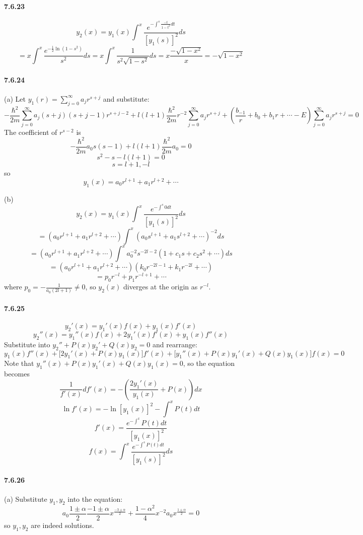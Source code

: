 \documentclass[a4paper]{article}
\begin{document}
\paragraph{7.6.23}
\[
y_2(x)=y_1(x)\int^x\frac{e^{-\int^s\frac{-t}{1-t^2}dt}}{[y_1(s)]^2}ds
\]
\[
=x\int^x\frac{e^{-\frac{1}{2}\ln(1-s^2)}}{s^2}ds=x\int^x\frac{1}{s^2\sqrt{1-s^2}}ds=x\frac{-\sqrt{1-x^2}}{x}=-\sqrt{1-x^2}
\]

\paragraph{7.6.24}
(a)
Let $y_1(r)=\sum_{j=0}^\infty a_jr^{s+j}$ and substitute:
\[
-\frac{\hbar^2}{2m}\sum_{j=0}^\infty a_j(s+j)(s+j-1)r^{s+j-2}+l(l+1)\frac{\hbar^2}{2m}r^{-2}\sum_{j=0}^\infty a_jr^{s+j}+(\frac{b_{-1}}{r}+b_0+b_1r+\cdots-E)\sum_{j=0}^\infty a_jr^{s+j}=0
\]
The coefficient of $r^{s-2}$ is
\[
-\frac{\hbar^2}{2m}a_0s(s-1)+l(l+1)\frac{\hbar^2}{2m}a_0=0
\]
\[
s^2-s-l(l+1)=0
\]
\[
s=l+1,-l
\]
so 
\[
y_1(x)=a_0r^{l+1}+a_1r^{l+2}+\cdots
\]

(b)
\[
y_2(x)=y_1(x)\int^x\frac{e^{-\int^s0dt}}{[y_1(s)]^2}ds
\]
\[
=(a_0r^{l+1}+a_1r^{l+2}+\cdots)\int^x(a_0s^{l+1}+a_1s^{l+2}+\cdots)^{-2}ds
\]
\[
=(a_0r^{l+1}+a_1r^{l+2}+\cdots)\int^xa_0^{-2}s^{-2l-2}(1+c_1s+c_2s^{2}+\cdots)ds
\]
\[
=(a_0r^{l+1}+a_1r^{l+2}+\cdots)(k_0r^{-2l-1}+k_1r^{-2l}+\cdots)
\]
\[
=p_0r^{-l}+p_1r^{-l+1}+\cdots
\]
where $p_0=-\frac{1}{a_0(2l+1)}\neq0$, so $y_2(x)$ diverges at the origin as $r^{-l}$.

\paragraph{7.6.25}
\[
y_2'(x)=y_1'(x)f(x)+y_1(x)f'(x)
\]
\[
y_2''(x)=y_1''(x)f(x)+2y_1'(x)f'(x)+y_1(x)f''(x)
\]
Substitute into $y_2''+P(x)y_2'+Q(x)y_2=0$ and rearrange:
\[
y_1(x)f''(x)+\big[2y_1'(x)+P(x)y_1(x)\big]f'(x)+\big[y_1''(x)+P(x)y_1'(x)+Q(x)y_1(x)\big]f(x)=0
\]
Note that $y_1''(x)+P(x)y_1'(x)+Q(x)y_1(x)=0$, so the equation becomes
\[
\frac{1}{f'(x)}df'(x)=-\left(\frac{2y_1'(x)}{y_1(x)}+P(x) \right)dx
\]
\[
\ln f'(x)=-\ln[y_1(x)]^2-\int^xP(t)dt
\]
\[
f'(x)=\frac{e^{-\int^x}P(t)dt}{[y_1(x)]^2}
\]
\[
f(x)=\int^x\frac{e^{-\int^sP(t)dt}}{[y_1(s)]^2}ds
\]

\paragraph{7.6.26}
(a)
Substitute $y_1,y_2$ into the equation:
\[
a_0\frac{1\pm\alpha}{2}\frac{-1\pm\alpha}{2}x^{\frac{-3\pm\alpha}{2}}+\frac{1-\alpha^2}{4}x^{-2}a_0x^{\frac{1\pm\alpha}{2}}=0
\]
so $y_1,y_2$ are indeed solutions.
\medskip
\end{document}
